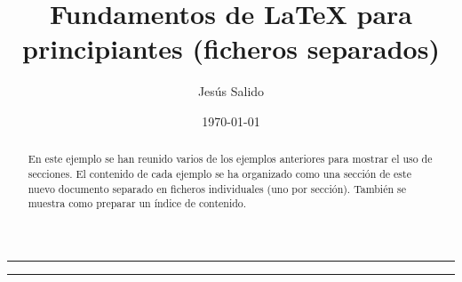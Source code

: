 \documentclass[11pt,a4paper]{article}
\author{Jesús Salido}
\title{Fundamentos de \LaTeX{} para principiantes (ficheros separados)}
\date{\today}
\begin{document}
\maketitle

\begin{abstract}
	En este ejemplo se han reunido varios de los ejemplos anteriores para mostrar el uso de secciones. El contenido de cada ejemplo se ha organizado como una sección de este nuevo documento separado en ficheros individuales (uno por sección). También se muestra como preparar un índice de contenido.
\end{abstract}


\hrule %
\tableofcontents %
\vspace{0.5cm} %
\hrule


%
%
%
%





\end{document}
